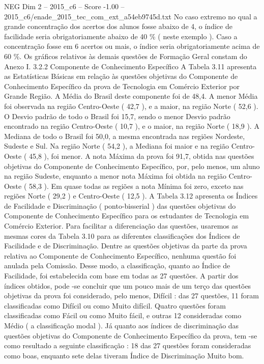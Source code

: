 \begin{textsample}{NEG Dim 2 – 2015\_c6 – Score -1.00 – 2015\_c6/enade\_2015\_tec\_com\_ext\_a54eb9745d.txt}
No caso extremo no qual a grande concentração dos acertos dos alunos fosse abaixo de 4, o índice de facilidade seria obrigatoriamente abaixo de 40 \% ( neste exemplo ).
Caso a concentração fosse em 6 acertos ou mais, o índice seria obrigatoriamente acima de 60 \%.
Os gráficos relativos às demais questões de Formação Geral constam do Anexo I. 3.2.2 Componente de Conhecimento Específico A Tabela 3.11 apresenta as Estatísticas Básicas em relação às questões objetivas do Componente de Conhecimento Específico da prova de Tecnologia em Comércio Exterior por Grande Região.
A Média do Brasil deste componente foi de 48,4.
A menor Média foi observada na região Centro-Oeste ( 42,7 ), e a maior, na região Norte ( 52,6 ).
O Desvio padrão de todo o Brasil foi 15,7, sendo o menor Desvio padrão encontrado na região Centro-Oeste ( 10,7 ), e o maior, na região Norte ( 18,9 ).
A Mediana de todo o Brasil foi 50,0, a mesma encontrada nas regiões Nordeste, Sudeste e Sul.
Na região Norte ( 54,2 ), a Mediana foi maior e na região Centro-Oeste ( 45,8 ), foi menor.
A nota Máxima da prova foi 91,7, obtida nas questões objetivas do Componente de Conhecimento Específico, por, pelo menos, um aluno na região Sudeste, enquanto a menor nota Máxima foi obtida na região Centro-Oeste ( 58,3 ).
Em quase todas as regiões a nota Mínima foi zero, exceto nas regiões Norte ( 29,2 ) e Centro-Oeste ( 12,5 ).
A Tabela 3.12 apresenta os Índices de Facilidade e Discriminação ( ponto-bisserial ) das questões objetivas do Componente de Conhecimento Específico para os estudantes de Tecnologia em Comércio Exterior.
Para facilitar a diferenciação das questões, usaremos as mesmas cores da Tabela 3.10 para as diferentes classificações dos Índices de Facilidade e de Discriminação.
Dentre as questões objetivas da parte da prova relativa ao Componente de Conhecimento Específico, nenhuma questão foi anulada pela Comissão.
Desse modo, a classificação, quanto ao Índice de Facilidade, foi estabelecida com base em todas as 27 questões.
A partir dos índices obtidos, pode -se concluir que um pouco mais de um terço das questões objetivas da prova foi considerado, pelo menos, Difícil : das 27 questões, 11 foram classificadas como Difícil ou como Muito difícil.
Quatro questões foram classificadas como Fácil ou como Muito fácil, e outras 12 consideradas como Médio ( a classificação modal ).
Já quanto aos índices de discriminação das questões objetivas do Componente de Conhecimento Específico da prova, tem -se como resultado a seguinte classificação : 18 das 27 questões foram consideradas como boas, enquanto sete delas tiveram Índice de Discriminação Muito bom.

\end{textsample}
